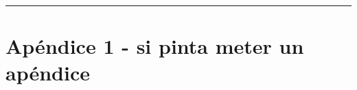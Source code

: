 \documentclass[11pt,a4paper]{extarticle}
\begin{document}
\newpage
\begin{appendices}
\vspace{-1em}
\hrule
\vspace{1em}
\normalsize
\section{Apéndice 1 - si pinta meter un apéndice}
\end{appendices}
\end{document}
